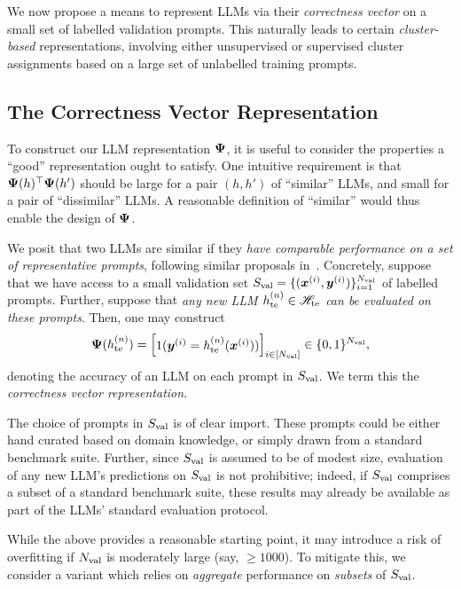 

We now propose a means to represent LLMs via their
\emph{correctness vector} on a small set of labelled validation prompts.
This naturally leads to certain \emph{cluster-based} representations, involving either unsupervised or supervised cluster assignments based on a large set of unlabelled training prompts.



\subsection{The Correctness Vector Representation}
\label{sec:correctness_representation}

To construct our LLM representation $\boldsymbol{\Psi}$,
it is useful to consider the properties a ``good'' representation ought to satisfy.
One intuitive requirement is that $\boldsymbol{\Psi}( h )^\top \boldsymbol{\Psi}( h' )$ should be large for a pair $(h, h')$ of ``similar'' LLMs,
and small for a pair of ``dissimilar'' LLMs.
A reasonable definition of ``similar'' would thus enable the design of $\boldsymbol{\Psi}$.

We posit that two LLMs are similar if they 
\emph{have comparable performance on a set of representative prompts},
following similar proposals in~\citet{Thrush:2024,ZhuWuWen2024}.
Concretely, suppose 
that
we have access to a small validation set $S_{\textrm{val}} = \{(\boldsymbol{x}^{(i)},\boldsymbol{y}^{(i)})\}_{i=1}^{N_{\textrm{val}}}$ of labelled prompts.
Further, suppose that 
\emph{any new LLM 
$h_{\mathrm{te}}^{( n )} \in \mathscr{H}_{\mathrm{te}}$
can be evaluated on these prompts}.
Then, 
one may construct
$$ \boldsymbol{\Psi}( h_{\mathrm{te}}^{( n )} ) = \begin{bmatrix} 1( \boldsymbol{y}^{(i)} = h_{\mathrm{te}}^{( n )}( \boldsymbol{x}^{(i)} ) ) \end{bmatrix}_{i \in [ N_{\textrm{val}} ]} \in \{ 0, 1 \}^{N_{\textrm{val}}}, $$ 
denoting the accuracy of an LLM on each prompt in $S_{\textrm{val}}$.
We term this the \emph{correctness vector representation}.

The choice of prompts in $S_{\textrm{val}}$ is of clear import.
These prompts could be either hand curated based on domain knowledge,
or simply drawn from a standard benchmark suite.
Further,
since $S_{\textrm{val}}$ is assumed to be of modest size, 
evaluation of any new LLM's predictions on $S_{\textrm{val}}$ is not prohibitive;
indeed, if $S_{\textrm{val}}$ comprises a subset of a standard benchmark suite,
these results may already be available as part of the LLMs' standard evaluation protocol.

While the above provides a reasonable starting point,
it may introduce a risk of overfitting if $N_{\rm val}$ is moderately large (say, $\geq 1000$).
To mitigate this, we consider a variant which relies on \emph{aggregate} performance on \emph{subsets} of $S_{\textrm{val}}$.


